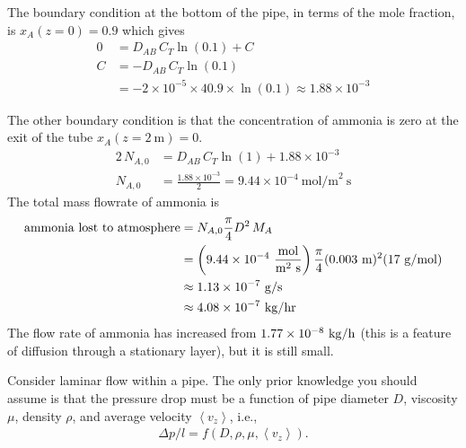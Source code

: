 \documentclass[calculator,datasheet,handbook]{exam}
\begin{document}
{\begin{question}
\begin{enumerate}[a)]
{        The boundary condition at the bottom of the pipe, in terms of
        the mole fraction, is $x_A(z=0) = 0.9$ which gives
        \begin{align*}
          0 &= D_{AB}\,C_T \ln\left(0.1\right) + C\\
          C &= -D_{AB}\,C_T \ln\left(0.1\right)\\
            &= -2\times10^{-5}\times40.9\times\ln\left(0.1\right) \approx
              1.88\times10^{-3}
        \end{align*}
        
        The other boundary condition is that the concentration of
        ammonia is zero at the exit of the tube $x_A(z=2~\text{m})=0$.
        \begin{align*}
          2\,N_{A,0} &= D_{AB}\,C_T \ln\left(1\right) + 1.88\times10^{-3}\\
          N_{A,0} &= \frac{1.88\times10^{-3}}{2} =9.44\times10^{-4}~\text{mol/m}^2~\text{s}
        \end{align*}
        The total mass flowrate of ammonia is 
        \begin{align*}
          \mbox{ammonia lost to atmosphere} &= N_{A,0} \frac{\pi}{4}D^2\,M_{A} 
          \\
                                            &= \left(9.44\times10^{-4}~\frac{\rm mol}{{\rm m}^2~{\rm s}}\right)
                                              \frac{\pi}{4}(0.003~{\rm m})^2(17~{\rm g/mol})
          \\
                                            &\approx 1.13\times10^{-7}~{\rm g/s}
          \\
                                            &\approx 4.08\times10^{-7}~{\rm kg/hr}
        \end{align*}
        The flow rate of ammonia has increased from
        $1.77\times10^{-8}~{\rm kg/h}$ (this is a feature of diffusion
        through a stationary layer), but it is still small.
      }
    \end{enumerate}
  \end{question}
}{
  \begin{question}
    Consider laminar flow within a pipe. The only prior knowledge
    you should assume is that the pressure drop must be a function of
    pipe diameter $D$, viscosity $\mu$, density $\rho$, and average
    velocity $\left\langle v_z\right\rangle$, i.e.,
    \begin{align*}
      \Delta p/l = f\left(D, \rho, \mu, \left\langle v_z\right\rangle\right).

\end{align*}
\end{question}}
\end{document}
